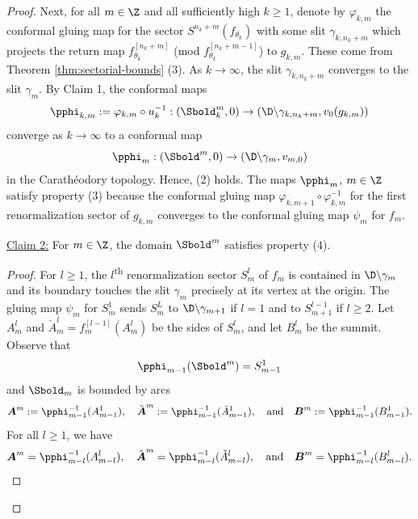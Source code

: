 \documentclass{amsart}
\begin{document}
\begin{proof}
    Next, for all $m \in \Z$ and all sufficiently high $k \geq 1$, denote by $\varphi_{k,m}$ the conformal gluing map for the sector $S^{n_k+m}(f_{\theta_k})$ with some slit $\gamma_{k,n_k+m}$ which projects the return map $f_{\theta_k}^{[n_k+m]}$ (mod $f_{\theta_k}^{[n_k+m-1]}$) to $g_{k,m}$. 
    These come from Theorem \ref{thm:sectorial-bounds} (3).
    As $k \to \infty$, the slit $\gamma_{k,n_k+m}$ converges to the slit $\gamma_{m}$.
    By Claim 1, the conformal maps 
    \[
        \pphi_{k,m} := \varphi_{k,m} \circ u_k^{-1}: (\Sbold_k^m,0) \to \left(\D \backslash \gamma_{k,n_k+m}, v_0(g_{k,m}) \right)
    \]
    converge as $k\to \infty$ to a conformal map 
    \[
        \pphi_m: \left( \Sbold^m,0 \right) \to \left( \D \backslash \gamma_m, v_{m,0} \right) 
    \]
    in the Carath\'eodory topology.
    Hence, (2) holds.
    The maps $\pphi_m$, $m \in \Z$ satisfy property (3) because the conformal gluing map $\varphi_{k,m+1} \circ \varphi_{k,m}^{-1}$ for the first renormalization sector of $g_{k,m}$ converges to the conformal gluing map $\psi_m$ for $f_m$.
    \vspace{0.1in}
    
    \noindent \underline{Claim 2:} For $m \in \Z$, the domain $\Sbold^m$ satisfies property (4).

    \begin{proof}
        For $l \geq 1$, the $l$\textsuperscript{th} renormalization sector $S_m^l$ of $f_m$ is contained in $\D \backslash \gamma_{m}$ and its boundary touches the slit $\gamma_{m}$ precisely at its vertex at the origin.
        The gluing map $\psi_{m}$ for $S_m^1$ sends $S_m^L$ to $\D\backslash \gamma_{m+1}$ if $l=1$ and to $S_{m+1}^{l-1}$ if $l\geq 2$.
        Let $A_m^l$ and $\check{A}_m^l = f_{m}^{[l-1]}(A_m^l)$ be the sides of $S_m^l$, and let $B_m^l$ be the summit.
        Observe that 
        \[
        \pphi_{m-1}(\Sbold^m) = S_{m-1}^1
        \]
        and $\Sbold_m$ is bounded by arcs 
        \[
        \boldsymbol{A}^{m} := \pphi_{m-1}^{-1}(A_{m-1}^1), \quad 
        \check{\boldsymbol{A}}^{m} := \pphi_{m-1}^{-1}(\check{A}_{m-1}^1), \quad \text{and} \quad 
        \boldsymbol{B}^{m} := \pphi_{m-1}^{-1}(B_{m-1}^1).
        \]
        For all $l \geq 1$, we have 
        \[
        \boldsymbol{A}^m = \pphi_{m-l}^{-1}(A_{m-l}^l), \quad 
        \check{\boldsymbol{A}}^m = \pphi_{m-l}^{-1}(\check{A}_{m-l}^l),
        \quad \text{and} \quad 
        \boldsymbol{B}^m = \pphi_{m-l}^{-1}(B_{m-l}^l).
        \]


\end{proof}
\end{proof}
\end{document}
